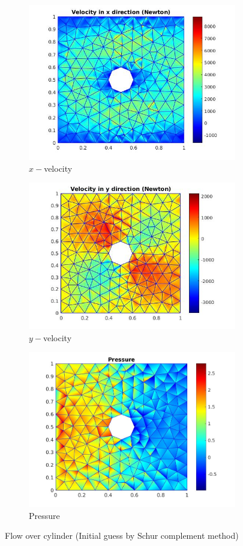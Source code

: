 \documentclass[a4paper,twoside,openright]{book}
\begin{document}
\begin{figure}
  \begin{subfigure}{\textwidth}
    \includegraphics[width=0.8\linewidth]{cylinder_newton_vx_schur.jpg}
    \caption{$x-$velocity}
  \label{x_vel_navier_stoke_schur}
  \end{subfigure}
  \begin{subfigure}{\textwidth}
    \includegraphics[width=0.8\linewidth]{cylinder_newton_vy_schur.jpg}
    \caption{$y-$velocity}
  \label{y_vel_navier_stoke_schur}
  \end{subfigure}
  \begin{subfigure}{\textwidth}
    \includegraphics[width=0.8\linewidth]{cylinder_newton_pressure_schur.jpg}
    \caption{Pressure}
  \label{pressure_navier_stoke_schur}
  \end{subfigure}
\caption{Flow over cylinder (Initial guess by Schur complement method)}
\label{flow_over_cylinder_schur_n_s}
\end{figure}
\end{document}
